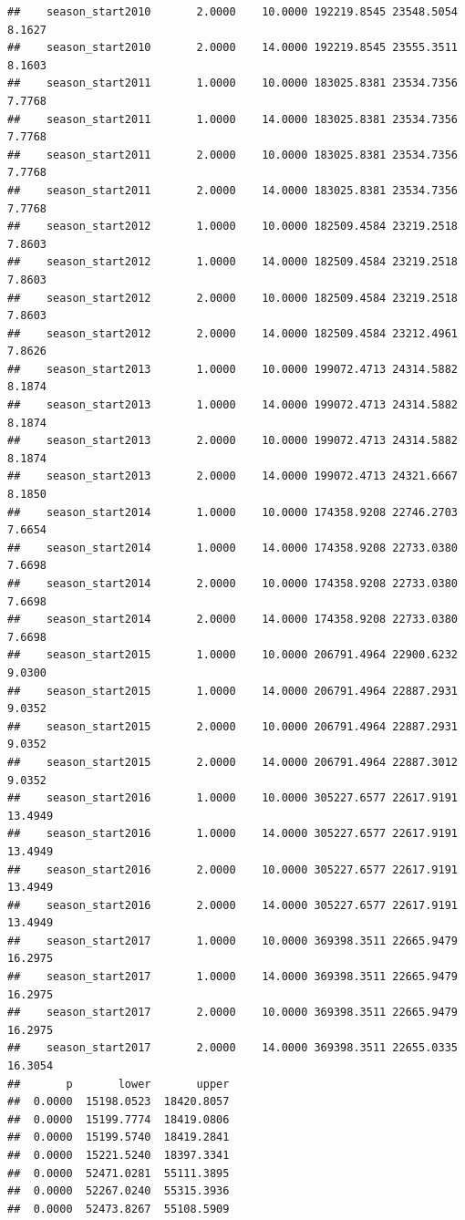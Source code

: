 \documentclass[
]{book}
\begin{document}
\begin{verbatim}
##    season_start2010       2.0000    10.0000 192219.8545 23548.5054  8.1627
##    season_start2010       2.0000    14.0000 192219.8545 23555.3511  8.1603
##    season_start2011       1.0000    10.0000 183025.8381 23534.7356  7.7768
##    season_start2011       1.0000    14.0000 183025.8381 23534.7356  7.7768
##    season_start2011       2.0000    10.0000 183025.8381 23534.7356  7.7768
##    season_start2011       2.0000    14.0000 183025.8381 23534.7356  7.7768
##    season_start2012       1.0000    10.0000 182509.4584 23219.2518  7.8603
##    season_start2012       1.0000    14.0000 182509.4584 23219.2518  7.8603
##    season_start2012       2.0000    10.0000 182509.4584 23219.2518  7.8603
##    season_start2012       2.0000    14.0000 182509.4584 23212.4961  7.8626
##    season_start2013       1.0000    10.0000 199072.4713 24314.5882  8.1874
##    season_start2013       1.0000    14.0000 199072.4713 24314.5882  8.1874
##    season_start2013       2.0000    10.0000 199072.4713 24314.5882  8.1874
##    season_start2013       2.0000    14.0000 199072.4713 24321.6667  8.1850
##    season_start2014       1.0000    10.0000 174358.9208 22746.2703  7.6654
##    season_start2014       1.0000    14.0000 174358.9208 22733.0380  7.6698
##    season_start2014       2.0000    10.0000 174358.9208 22733.0380  7.6698
##    season_start2014       2.0000    14.0000 174358.9208 22733.0380  7.6698
##    season_start2015       1.0000    10.0000 206791.4964 22900.6232  9.0300
##    season_start2015       1.0000    14.0000 206791.4964 22887.2931  9.0352
##    season_start2015       2.0000    10.0000 206791.4964 22887.2931  9.0352
##    season_start2015       2.0000    14.0000 206791.4964 22887.3012  9.0352
##    season_start2016       1.0000    10.0000 305227.6577 22617.9191 13.4949
##    season_start2016       1.0000    14.0000 305227.6577 22617.9191 13.4949
##    season_start2016       2.0000    10.0000 305227.6577 22617.9191 13.4949
##    season_start2016       2.0000    14.0000 305227.6577 22617.9191 13.4949
##    season_start2017       1.0000    10.0000 369398.3511 22665.9479 16.2975
##    season_start2017       1.0000    14.0000 369398.3511 22665.9479 16.2975
##    season_start2017       2.0000    10.0000 369398.3511 22665.9479 16.2975
##    season_start2017       2.0000    14.0000 369398.3511 22655.0335 16.3054
##       p       lower       upper
##  0.0000  15198.0523  18420.8057
##  0.0000  15199.7774  18419.0806
##  0.0000  15199.5740  18419.2841
##  0.0000  15221.5240  18397.3341
##  0.0000  52471.0281  55111.3895
##  0.0000  52267.0240  55315.3936
##  0.0000  52473.8267  55108.5909

\end{verbatim}
\end{document}
